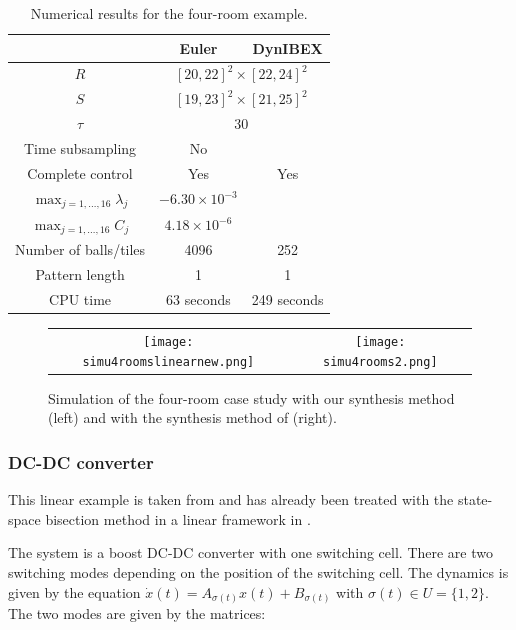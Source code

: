  \begin{table}[h]
 \centering
\begin{tabular}{|c|c|c|}
   \hline 
   &\multicolumn{1}{c|}{Euler} & \multicolumn{1}{c|}{DynIBEX} \\
   \hline
   $R$ & \multicolumn{2}{c|}{$[20,22]^2\times[22,24]^2$} \\
   $S$ & \multicolumn{2}{c|}{$[19,23]^2\times[21,25]^2$} \\   
\hline
$\tau$ & \multicolumn{2}{c|}{30} \\
\hline
Time subsampling & No & \\   
   \hline
 Complete control & Yes  & Yes \\
\hline
$\max_{j= 1, \dots,16} \lambda_j$  &  $-6.30\times 10^{-3}$   &        \\
$\max_{j= 1, \dots,16} C_j$  &  $4.18\times 10^{-6}$ &                     \\
\hline
Number of balls/tiles & 4096 & 252 \\
Pattern length & 1 & 1 \\
\hline
CPU time &  63 seconds & 249 seconds\\ \hline
  \end{tabular}
\label{table:4M}
\caption{Numerical results for the four-room example.}
 \end{table} 
 

\begin{figure}[h]
\centering
\begin{tabular}{cc}
 \texttt{[image: simu4roomslinearnew.png]}
&
 \texttt{[image: simu4rooms2.png]}
\end{tabular}
\caption{Simulation of the four-room case study with our synthesis method (left) and with the synthesis method of \cite{NL_minimator}  (right).}
\label{fig:simu}
\end{figure}

\subsubsection{DC-DC converter}

This linear example is taken from \cite{beccuti2005optimal} and has
already been treated with the state-space bisection method in a linear
framework in \cite{fribourg2014finite}.

The system is a boost DC-DC converter with one switching cell.  There
are two switching modes depending on the position of the switching
cell. The dynamics is given by the equation $\dot x (t) =
A_{\sigma(t)} x(t) + B_{\sigma(t)}$ with $\sigma(t) \in U = \{ 1,2
\}$. The two modes are given by the matrices:

